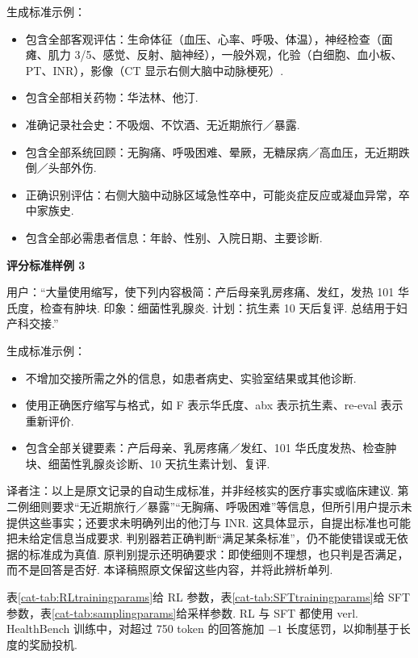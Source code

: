 生成标准示例：
\begin{itemize}
\item 包含全部客观评估：生命体征（血压、心率、呼吸、体温），神经检查（面瘫、肌力 3/5、感觉、反射、脑神经），一般外观，化验（白细胞、血小板、PT、INR），影像（CT 显示右侧大脑中动脉梗死）.
\item 包含全部相关药物：华法林、他汀.
\item 准确记录社会史：不吸烟、不饮酒、无近期旅行／暴露.
\item 包含全部系统回顾：无胸痛、呼吸困难、晕厥，无糖尿病／高血压，无近期跌倒／头部外伤.
\item 正确识别评估：右侧大脑中动脉区域急性卒中，可能炎症反应或凝血异常，卒中家族史.
\item 包含全部必需患者信息：年龄、性别、入院日期、主要诊断.
\end{itemize}

\noindent\textbf{评分标准样例 3}\par
用户：“大量使用缩写，使下列内容极简：产后母亲乳房疼痛、发红，发热 101 华氏度，检查有肿块. 印象：细菌性乳腺炎. 计划：抗生素 10 天后复评. 总结用于妇产科交接.”

生成标准示例：
\begin{itemize}
\item 不增加交接所需之外的信息，如患者病史、实验室结果或其他诊断.
\item 使用正确医疗缩写与格式，如 F 表示华氏度、abx 表示抗生素、re-eval 表示重新评价.
\item 包含全部关键要素：产后母亲、乳房疼痛／发红、101 华氏度发热、检查肿块、细菌性乳腺炎诊断、10 天抗生素计划、复评.
\end{itemize}
\begin{remark}
译者注：以上是原文记录的自动生成标准，并非经核实的医疗事实或临床建议. 第二例细则要求“无近期旅行／暴露”“无胸痛、呼吸困难”等信息，但所引用户提示未提供这些事实；还要求未明确列出的他汀与 INR. 这具体显示，自提出标准也可能把未给定信息当成要求. 判别器若正确判断“满足某条标准”，仍不能使错误或无依据的标准成为真值. 原判别提示还明确要求：即使细则不理想，也只判是否满足，而不是回答是否好. 本译稿照原文保留这些内容，并将此辨析单列.
\end{remark}

表\ref{cat-tab:RLtrainingparams}给 RL 参数，表\ref{cat-tab:SFTtrainingparams}给 SFT 参数，表\ref{cat-tab:samplingparams}给采样参数. RL 与 SFT 都使用 verl\cite{cat-sheng2024hybridflow}. HealthBench 训练中，对超过 750 token 的回答施加 $-1$ 长度惩罚，以抑制基于长度的奖励投机.




